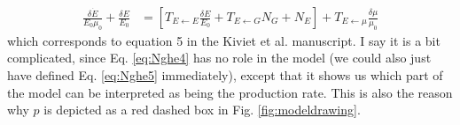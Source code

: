 %
\begin{align}
\label{eq:Nghe5}
\frac{ \delta{\dot{E}} }{E_0 \mu_0} 
+ \frac{\delta E}{E_0} 
& = 
\left[
 T_{E \leftarrow E} \frac{\delta E}{E_0} + T_{E \leftarrow G} N_G + N_E 
 \right]
 + T_{E \leftarrow \mu} \frac{\delta \mu}{\mu_0} 
\end{align}
%
which corresponds to equation 5 in the Kiviet et al. \cite{Kiviet2014} manuscript.
I say it is a bit complicated, since Eq. \ref{eq:Nghe4} has no role in the model (we could also just have defined Eq. \ref{eq:Nghe5} immediately), except that it shows us which part of the model can be interpreted as being the production rate.
This is also the reason why $p$ is depicted as a red dashed box in Fig. \ref{fig:modeldrawing}.

%
%
